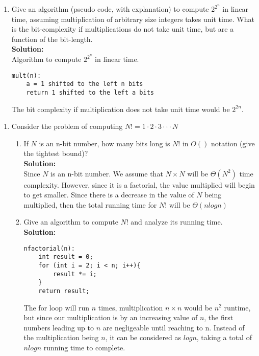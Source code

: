 \documentclass{article}
\begin{document}
    \begin{enumerate}[label=\textbf{Q1}]
        \item Give an algorithm (pseudo code, with explanation) to compute $2^{2^n}$ in linear time, assuming multiplication of arbitrary size integers takes unit time. What is the bit-complexity if multiplications do not take unit time, but are a function of the bit-length. \\
        \textbf{Solution:}\\
        Algorithm to compute $2^{2^n}$ in linear time.
        \begin{verbatim}
mult(n):
    a = 1 shifted to the left n bits
    return 1 shifted to the left a bits
        \end{verbatim}
        The bit complexity if multiplication does not take unit time would be
        $2^{2n}$.
    \end{enumerate}

    \begin{enumerate}[label=\textbf{Q2}]
        \item Consider the problem of computing $N! = 1 \cdot 2 \cdot 3 \cdot \cdot \cdot N$
        \begin{enumerate}[label=(\alph*)]
            \item If $N$ is an n-bit number, how many bits long is $N!$ in $O()$ notation (give the tightest bound)?\\
            \textbf{Solution:}\\
            Since $N$ is an n-bit number. We assume that $N \times N$ will be $\Theta(N^2)$ time
            complexity. However, since it is a factorial, the value multiplied will begin to get smaller.
            Since there is a decrease in the value of $N$ being multiplied, then the total running
            time for $N!$ will be $\Theta(nlogn)$
            \item Give an algorithm to compute $N!$ and analyze its running time.\\
            \textbf{Solution:}
            \begin{verbatim}
nfactorial(n):
    int result = 0;
    for (int i = 2; i < n; i++){
        result *= i;
    }
    return result;
            \end{verbatim}
            The for loop will run $n$ times, multiplication $n \times n$ would be $n^2$ runtime,
            but since our multiplication is by an increasing value of $n$, the first numbers leading
            up to $n$ are negligeable until reaching to n. Instead of the multiplication being $n$, 
            it can be considered as $log n$, taking a total of $nlogn$ running time to complete.
        \end{enumerate}
    \end{enumerate}
\end{document}
